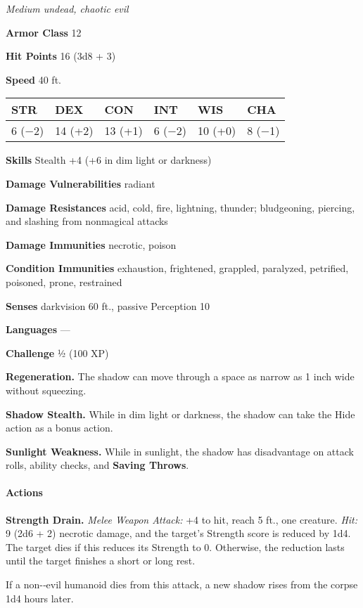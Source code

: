 \documentclass[
]{article}
\begin{document}
\emph{Medium undead, chaotic evil}

\textbf{Armor Class} 12

\textbf{Hit Points} 16 (3d8 + 3)

\textbf{Speed} 40 ft.

\begin{longtable}[]{@{}llllll@{}}
\toprule
STR & DEX & CON & INT & WIS & CHA\tabularnewline
\midrule
\endhead
6 (−2) & 14 (+2) & 13 (+1) & 6 (−2) & 10 (+0) & 8 (−1)\tabularnewline
\bottomrule
\end{longtable}

\textbf{Skills} Stealth +4 (+6 in dim light or darkness)

\textbf{Damage Vulnerabilities} radiant

\textbf{Damage Resistances} acid, cold, fire, lightning, thunder;
bludgeoning, piercing, and slashing from nonmagical attacks

\textbf{Damage Immunities} necrotic, poison

\textbf{Condition Immunities} exhaustion, frightened, grappled,
paralyzed, petrified, poisoned, prone, restrained

\textbf{Senses} darkvision 60 ft., passive Perception 10

\textbf{Languages} ---

\textbf{Challenge} ½ (100 XP)

\textbf{Regeneration.} The shadow can move through a space as narrow as
1 inch wide without squeezing.

\textbf{Shadow Stealth.} While in dim light or darkness, the shadow can
take the Hide action as a bonus action.

\textbf{Sunlight Weakness.} While in sunlight, the shadow has
disadvantage on attack rolls, ability checks, and \textbf{Saving
Throws}.

\hypertarget{actions-3}{%
\paragraph{Actions}\label{actions-3}}

\textbf{Strength Drain.} \emph{Melee Weapon Attack:} +4 to hit, reach 5
ft., one creature. \emph{Hit:} 9 (2d6 + 2) necrotic damage, and the
target's Strength score is reduced by 1d4. The target dies if this
reduces its Strength to 0. Otherwise, the reduction lasts until the
target finishes a short or long rest.

If a non-­‐evil humanoid dies from this attack, a new shadow rises from
the corpse 1d4 hours later.
\end{document}
